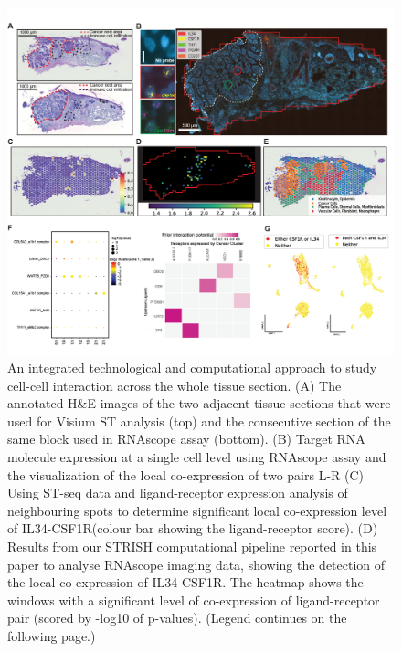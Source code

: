 \begin{figure}[htp]
    \centering
    \includegraphics[width=\columnwidth]{Chapter2/Figures/Chapter2_Result_figure1.png}
    \caption[An integrated technological and computational approach to study cell-cell interaction across the whole tissue section.]{ An integrated technological and computational approach to study cell-cell interaction across the whole tissue section. (A) The annotated H\&E images of the two adjacent tissue sections that were used for Visium ST analysis (top) and the consecutive section of the same block used in RNAscope assay (bottom). (B) Target RNA molecule expression at a single cell level using RNAscope assay and the visualization of the local co-expression of two pairs L-R (C) Using ST-seq data and ligand-receptor expression analysis of neighbouring spots to determine significant local co-expression level of IL34-CSF1R(colour bar showing the ligand-receptor score). (D) Results from our STRISH computational pipeline reported in this paper to analyse RNAscope imaging data, showing the detection of the local co-expression of IL34-CSF1R. The heatmap shows the windows with a significant level of co-expression of ligand-receptor pair (scored by -log10 of p-values). (Legend continues on the following page.)}
    \label{fig:Chap2_figure1_result}
\end{figure}
\begin{figure}[t]
\end{figure}
